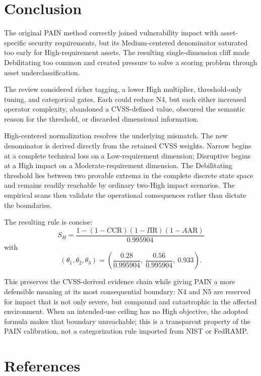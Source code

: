 \documentclass[11pt]{article}
\begin{document}
\section{Conclusion}

The original PAIN method correctly joined vulnerability impact with asset-specific
security requirements, but its Medium-centered denominator saturated too early for
High-requirement assets. The resulting single-dimension cliff made Debilitating too
common and created pressure to solve a scoring problem through asset
underclassification.

The review considered richer tagging, a lower High multiplier, threshold-only
tuning, and categorical gates. Each could reduce N4, but each either increased
operator complexity, abandoned a CVSS-defined value, obscured the semantic reason
for the threshold, or discarded dimensional information.

High-centered normalization resolves the underlying mismatch. The new denominator
is derived directly from the retained CVSS weights. Narrow begins at a complete
technical loss on a Low-requirement dimension; Disruptive begins at a High impact
on a Moderate-requirement dimension. The Debilitating threshold lies between two
provable extrema in the complete discrete state space and remains readily reachable
by ordinary two-High impact scenarios. The empirical scans then validate the
operational consequences rather than dictate the boundaries.

The resulting rule is concise:
\[
\boxed{
S_H=\frac{1-(1-C\mathrm{CR})(1-I\mathrm{IR})(1-A\mathrm{AR})}{0.995904}
}
\]
with
\[
\boxed{
(\theta_1,\theta_2,\theta_3)
=\left(\frac{0.28}{0.995904},\ \frac{0.56}{0.995904},\ 0.933\right).
}
\]

This preserves the CVSS-derived evidence chain while giving PAIN a more defensible
meaning at its most consequential boundary: N4 and N5 are reserved for impact that
is not only severe, but compound and catastrophic in the affected environment.
When an intended-use ceiling has no High objective, the adopted formula makes that
boundary unreachable; this is a transparent property of the PAIN calibration,
not a categorization rule imported from NIST or FedRAMP.

\clearpage
\section*{References}
\end{document}
